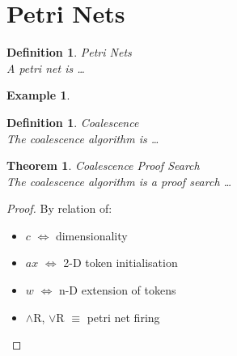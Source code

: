 \documentclass{article}
\theoremstyle{indented}
\newtheorem{theorem}[sec-ctr]{Theorem}
\newtheorem{definition}[sec-ctr]{Definition}
\newtheorem*{example*}{Example}
\begin{document}
    \section{Petri Nets}
        
        \begin{definition}{Petri Nets\\}
            A petri net is \ldots
        \end{definition}

        \begin{example*}
        \end{example*}

        
        \begin{definition}{Coalescence\\}
            The coalescence algorithm is \ldots
        \end{definition}


        \begin{theorem}{Coalescence Proof Search\\}
            The coalescence algorithm is a proof search \ldots
        \end{theorem}

        \begin{proof}
            By relation of:
            \begin{itemize}
                \item $c$ $\iff$ dimensionality
                \item $ax$ $\iff$ 2-D token initialisation
                \item $w$ $\iff$ n-D extension of tokens
                \item $\wedge$R, $\vee$R $\equiv$ petri net firing
            \end{itemize}
        \end{proof}
        
\end{document}
